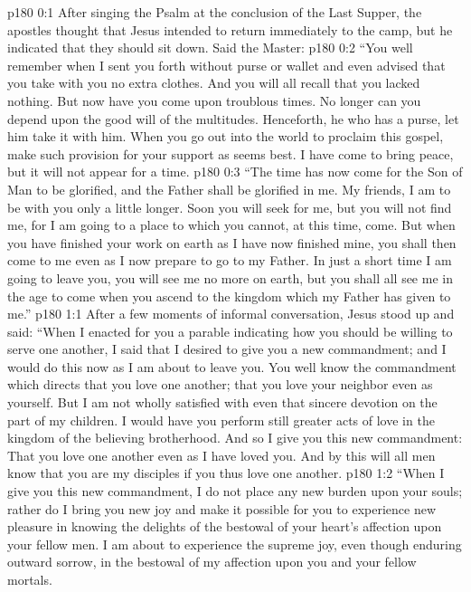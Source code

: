 \author{Midwayer Commission}
\vs p180 0:1 After singing the Psalm at the conclusion of the Last Supper, the apostles thought that Jesus intended to return immediately to the camp, but he indicated that they should sit down. Said the Master:\plusone
\vs p180 0:2 \textcolor{ubdarkred}{“You well remember when I sent you forth without purse or wallet and even advised that you take with you no extra clothes. And you will all recall that you lacked nothing. But now have you come upon troublous times. No longer can you depend upon the good will of the multitudes. Henceforth, he who has a purse, let him take it with him. When you go out into the world to proclaim this gospel, make such provision for your support as seems best. I have come to bring peace, but it will not appear for a time.}
\vs p180 0:3 \textcolor{ubdarkred}{“The time has now come for the Son of Man to be glorified, and the Father shall be glorified in me. My friends, I am to be with you only a little longer. Soon you will seek for me, but you will not find me, for I am going to a place to which you cannot, at this time, come. But when you have finished your work on earth as I have now finished mine, you shall then come to me even as I now prepare to go to my Father. In just a short time I am going to leave you, you will see me no more on earth, but you shall all see me in the age to come when you ascend to the kingdom which my Father has given to me.”}
\vs p180 1:1 After a few moments of informal conversation, Jesus stood up and said: \textcolor{ubdarkred}{“When I enacted for you a parable indicating how you should be willing to serve one another, I said that I desired to give you a new commandment; and I would do this now as I am about to leave you. You well know the commandment which directs that you love one another; that you love your neighbor even as yourself. But I am not wholly satisfied with even that sincere devotion on the part of my children. I would have you perform still greater acts of love in the kingdom of the believing brotherhood. And so I give you this new commandment: That you love one another even as I have loved you. And by this will all men know that you are my disciples if you thus love one another.}
\vs p180 1:2 \textcolor{ubdarkred}{“When I give you this new commandment, I do not place any new burden upon your souls; rather do I bring you new joy and make it possible for you to experience new pleasure in knowing the delights of the bestowal of your heart’s affection upon your fellow men. I am about to experience the supreme joy, even though enduring outward sorrow, in the bestowal of my affection upon you and your fellow mortals.}
